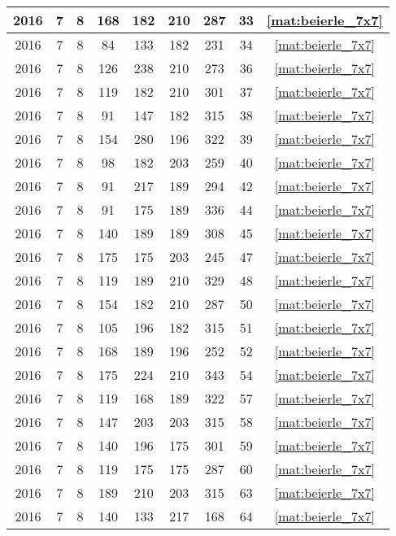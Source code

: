 \begin{longtable}{|c|c|c|c|c|c|c|c|c|}
2016 & 7 & 8 & 168 & 182 & 210 & 287 & 33 & \eqref{mat:beierle_7x7} \\ \hline 
2016 & 7 & 8 & 84 & 133 & 182 & 231 & 34 & \eqref{mat:beierle_7x7} \\ \hline 
2016 & 7 & 8 & 126 & 238 & 210 & 273 & 36 & \eqref{mat:beierle_7x7} \\ \hline 
2016 & 7 & 8 & 119 & 182 & 210 & 301 & 37 & \eqref{mat:beierle_7x7} \\ \hline 
2016 & 7 & 8 & 91 & 147 & 182 & 315 & 38 & \eqref{mat:beierle_7x7} \\ \hline 
2016 & 7 & 8 & 154 & 280 & 196 & 322 & 39 & \eqref{mat:beierle_7x7} \\ \hline 
2016 & 7 & 8 & 98 & 182 & 203 & 259 & 40 & \eqref{mat:beierle_7x7} \\ \hline 
2016 & 7 & 8 & 91 & 217 & 189 & 294 & 42 & \eqref{mat:beierle_7x7} \\ \hline 
2016 & 7 & 8 & 91 & 175 & 189 & 336 & 44 & \eqref{mat:beierle_7x7} \\ \hline 
2016 & 7 & 8 & 140 & 189 & 189 & 308 & 45 & \eqref{mat:beierle_7x7} \\ \hline 
2016 & 7 & 8 & 175 & 175 & 203 & 245 & 47 & \eqref{mat:beierle_7x7} \\ \hline 
2016 & 7 & 8 & 119 & 189 & 210 & 329 & 48 & \eqref{mat:beierle_7x7} \\ \hline 
2016 & 7 & 8 & 154 & 182 & 210 & 287 & 50 & \eqref{mat:beierle_7x7} \\ \hline 
2016 & 7 & 8 & 105 & 196 & 182 & 315 & 51 & \eqref{mat:beierle_7x7} \\ \hline 
2016 & 7 & 8 & 168 & 189 & 196 & 252 & 52 & \eqref{mat:beierle_7x7} \\ \hline 
2016 & 7 & 8 & 175 & 224 & 210 & 343 & 54 & \eqref{mat:beierle_7x7} \\ \hline 
2016 & 7 & 8 & 119 & 168 & 189 & 322 & 57 & \eqref{mat:beierle_7x7} \\ \hline 
2016 & 7 & 8 & 147 & 203 & 203 & 315 & 58 & \eqref{mat:beierle_7x7} \\ \hline 
2016 & 7 & 8 & 140 & 196 & 175 & 301 & 59 & \eqref{mat:beierle_7x7} \\ \hline 
2016 & 7 & 8 & 119 & 175 & 175 & 287 & 60 & \eqref{mat:beierle_7x7} \\ \hline 
2016 & 7 & 8 & 189 & 210 & 203 & 315 & 63 & \eqref{mat:beierle_7x7} \\ \hline 
2016 & 7 & 8 & 140 & 133 & 217 & 168 & 64 & \eqref{mat:beierle_7x7} \\ \hline 

\end{longtable}
